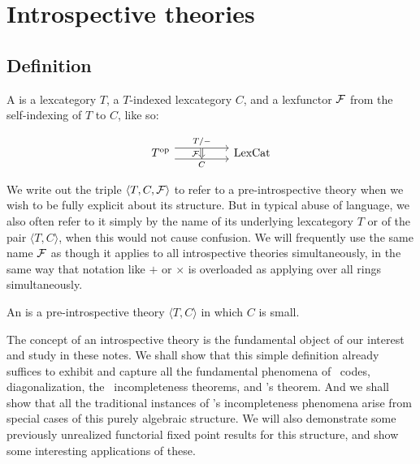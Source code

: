 \section{Introspective theories}

\subsection{Definition}
\begin{definition} \label{DefnPreIntrospIndexed}
A  is a lexcategory $T$, a $T$-indexed lexcategory $C$, and a lexfunctor $\mathcal{F}$ from the self-indexing of $T$ to $C$, like so:

\[\begin{tikzcd}
	{\op{T}} && {\LexCat}
	\arrow["{T/-}"{name=0}, from=1-1, to=1-3, shift left=2]
	\arrow["{C}"{name=1, swap}, from=1-1, to=1-3, shift right=2]
	\arrow[Rightarrow, "{\introF}"', from=0, to=1]
\end{tikzcd}\]
\end{definition}

We write out the triple $\langle T, C, \mathcal{F} \rangle$ to refer to a pre-introspective theory when we wish to be fully explicit about its structure. But in typical abuse of language, we also often refer to it simply by the name of its underlying lexcategory $T$ or of the pair $\langle T, C \rangle$, when this would not cause confusion. We will frequently use the same name $\mathcal{F}$ as though it applies to all introspective theories simultaneously, in the same way that notation like $+$ or $\times$ is overloaded as applying over all rings simultaneously.

\begin{definition} \label{DefnIntrospIndexed}
An  is a pre-introspective theory $\langle T, C \rangle$ in which $C$ is small.
\end{definition}

The concept of an introspective theory is the fundamental object of our interest and study in these notes. We shall show that this simple definition already suffices to exhibit and capture all the fundamental phenomena of \Goedel\ codes, diagonalization, the \Goedel\ incompleteness theorems, and \Loeb's theorem. And we shall show that all the traditional instances of \Goedel's incompleteness phenomena arise from special cases of this purely algebraic structure. We will also demonstrate some previously unrealized functorial fixed point results for this structure, and show some interesting applications of these.


